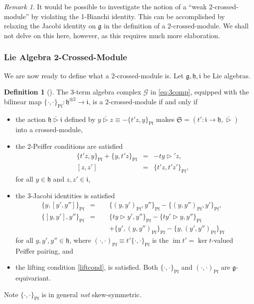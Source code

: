 \documentclass[onecolumn]{article}
\theoremstyle{theorem}
\theoremstyle{remark}
\newtheorem{remark}{Remark}[section]
\theoremstyle{example}
\theoremstyle{definition}
\newtheorem{definition}{Definition}[section]
\numberwithin{equation}{section}
\def\g{\mathfrak g}
\def\h{\mathfrak h}
\begin{document}
\begin{remark}
It would  be possible to investigate the notion of a ``weak 2-crossed-module'' by violating the 1-Bianchi identity. This can be accomplished by relaxing the Jacobi identity on $\mathfrak{g}$ in the definition of a 2-crossed-module. We shall not delve on this here, however, as this requires much more elaboration.
\end{remark}

\subsubsection{Lie Algebra 2-Crossed-Module}
We are now ready to define what a 2-crossed-module is. Let $\g,\h,\mathfrak{i}$ be Lie algebras.
\begin{definition}[\cite{Radenkovic:2019qme}]\label{def:2crmod} 
The 3-term algebra complex $\mathscr{G}$ in \eqref{eq:3comp}, equipped with the bilinear map $\{\cdot,\cdot\}_\text{Pf}: \h^{\otimes 2}\rightarrow \mathfrak{i}$, is a { {2-crossed-module}} if and only if
\begin{itemize}
    \item the action $\mathfrak{h}\bar\rhd \mathfrak{i}$ defined by $y\bar \rhd z\equiv -\{t'z,y\}_\text{Pf}$ makes $\mathfrak{S}=(t':\mathfrak{i}\rightarrow\mathfrak{h},\bar\rhd)$ into a crossed-module,
    \item the {{2-Peiffer conditions}} are satisfied
    \begin{eqnarray}
        \{t'z,y\}_\text{Pf} + \{y,t'z\}_\text{Pf} &=&-ty \rhd' z,\nonumber \\
        {[z,z']} &=&\{t' z,t' z'\}_\text{Pf},\nonumber
    \end{eqnarray}
    for all $y\in\mathfrak{h}$ and $z,z'\in\mathfrak{i}$,
    \item the {{3-Jacobi identities}} is satisfied
    \begin{eqnarray}
         \{y,[y',y'']\}_\text{Pf}&=&\{( y,y')_\text{Pf},y''\}_\text{Pf} - \{( y,y'')_\text{Pf},y'\}_\text{Pf},\nonumber\\
        \{[y,y'],y''\}_\text{Pf} &=& \{ty\rhd y',y''\}_\text{Pf} - \{ty'\rhd y,y''\}_\text{Pf} \nonumber \\
        &\qquad& + \{y',( y,y'')_\text{Pf}\}_\text{Pf} - \{y,( y',y'')_\text{Pf}\}_\text{Pf}\nonumber
    \end{eqnarray} 
    for all $y,y',y'' \in \mathfrak{h}$, where  $(\cdot,\cdot)_\text{Pf}\equiv t'\{\cdot,\cdot\}_\text{Pf}$ is the $\operatorname{im}t'=\operatorname{ker}t$-valued {Peiffer pairing}, and
    \item the lifting condition \eqref{liftcond}, is satisfied. Both $\{\cdot,\cdot\}_\text{Pf}$ and $(\cdot,\cdot)_\text{Pf}$ are $\g$-equivariant.
\end{itemize}

{Note} %
 $\{\cdot,\cdot\}_\text{Pf}$ is in general \textit{not} skew-symmetric.
\end{definition}
\end{document}
